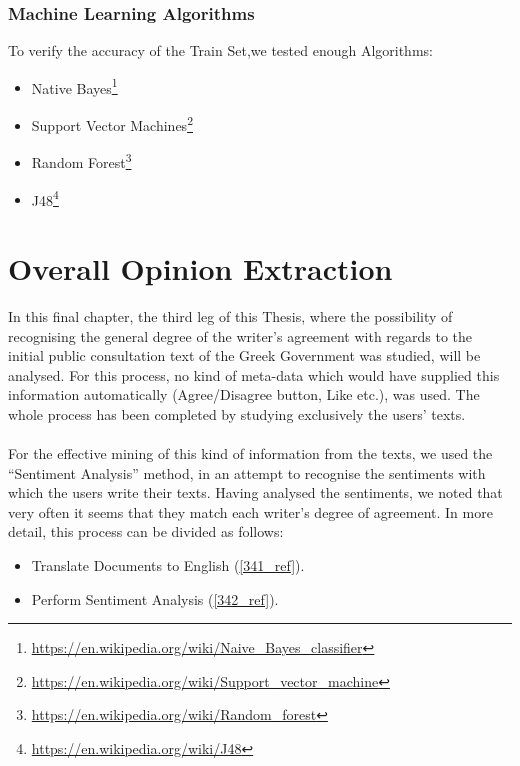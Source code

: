 \subsubsection{Machine Learning Algorithms}\label{3353_ref}
To verify the accuracy of the Train Set,we tested enough Algorithms:\\

\begin{itemize}

		\item Native Bayes\footnote{\url{https://en.wikipedia.org/wiki/Naive_Bayes_classifier}}
	\item Support Vector Machines\footnote{\url{https://en.wikipedia.org/wiki/Support_vector_machine}}
	\item Random Forest\footnote{\url{https://en.wikipedia.org/wiki/Random_forest}}
	\item J48\footnote{\url{https://en.wikipedia.org/wiki/J48}}

\end{itemize}

\section{Overall Opinion Extraction}\label{34_ref}
In this final chapter, the third leg of this Thesis, where the possibility of recognising the general degree of the writer's agreement with regards to the initial public consultation text of the Greek Government was studied, will be analysed. For this process, no kind of meta-data which would have supplied this information automatically (Agree/Disagree button, Like etc.), was used. The whole process has been completed by studying exclusively the users' texts.\\
\\
For the effective mining of this kind of information from the texts, we used the ``Sentiment Analysis'' method, in an attempt to recognise the sentiments with which the users write their texts. Having analysed the sentiments, we noted that very often it seems that they match each writer's degree of agreement. In more detail, this process can be divided as follows:\\
\begin{itemize}

	\item Translate Documents to English (\ref{341_ref}).
	\item Perform Sentiment Analysis  (\ref{342_ref}).\\

\end{itemize}

